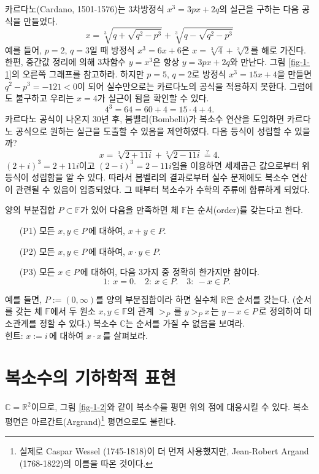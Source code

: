 카르다노(Cardano, 1501-1576)는 3차방정식 $x^3=3px+2q$의 실근을 구하는 다음 공식을 만들었다.
$$
x = \sqrt[3]{q+ \sqrt{q^2-p^3}} + \sqrt[3]{q- \sqrt{q^2-p^3}}
$$
예를 들어, $p=2$, $q=3$일 때 방정식 $x^3=6x+6$은 $x=\sqrt[3]{4}+\sqrt[3]{2}$를 해로 가진다.
한편, 중간값 정리에 의해 3차함수 $y=x^3$은  항상 $y=3px+2q$와 만난다.
그림 \ref{fig-1-1}의 오른쪽 그래프를 참고하라.
하지만 $p=5$, $q=2$로 방정식 $x^3=15 x+4$을 만들면 $q^2-p^3= -121<0$이 되어
실수만으로는 카르다노의 공식을 적용하지 못한다.
그럼에도 불구하고 우리는 $x=4$가 실근이 됨을 확인할 수 있다.
$$
4^3 = 64 = 60 + 4 = 15\cdot 4 + 4.
$$
카르다노 공식이 나온지 30년 후, 봄벨리(Bombelli)가 복소수 연산을 도입하면
카르다노 공식으로 원하는 실근을 도출할 수 있음을 제안하였다.
다음 등식이 성립할 수 있을까?
$$
x = \sqrt[3]{2+11i} + \sqrt[3]{2-11i} \stackrel{?}{=} 4.
$$
$(2+i)^3 = 2+11i$이고 $(2-i)^3 = 2-11i$임을 이용하면
세제곱근 값으로부터 위 등식이 성립함을 알 수 있다.
따라서 봄벨리의 결과로부터 실수 문제에도 복소수 연산이 관련될 수 있음이 입증되었다.
그 때부터 복소수가 수학의 주류에 합류하게 되었다.

\begin{salt_exercise} \label{ex-1-3}
양의 부분집합 $P\subset \mathbb F$가 있어 다음을 만족하면
체 $\mathbb F$는 순서(order)를 갖는다고 한다.
\begin{itemize}[topsep=-0.5\parskip, leftmargin=50pt]
\item[(P1)] 모든 $x,y\in P\,$에 대하여, $x+y\in P$.
\item[(P2)] 모든 $x,y\in P\,$에 대하여, $x\cdot y \in P$.
\item[(P3)] 모든 $x\in P\,$에 대하여, 다음 3가지 중  정확히 한가지만 참이다.
$$
1: \ x=0. \quad 2: \ x\in P. \quad 3: \ -x\in P.
$$
\end{itemize}
예를 들면, $P:=(0,\infty)$를 양의 부분집합이라 하면
실수체 $\mathbb R$은 순서를 갖는다.
(순서를 갖는 체 $\mathbb F$에서 두 원소 $x,y\in \mathbb F$의 관계 $>_P\,$를
$y>_P x\,$는 $y-x \in P\,$로 정의하여 대소관계를 정할 수 있다.)
복소수 $\mathbb C$는 순서를 가질 수 없음을 보여라. \\[1ex]
힌트: $x:=i\,$에 대하여 $x\cdot x\,$를 살펴보라.
\end{salt_exercise}

\section{복소수의 기하학적 표현}

$\mathbb C = \mathbb R^2$이므로, 
그림 \ref{fig-1-2}와 같이 복소수를 평면 위의 점에 대응시킬 수 있다.
복소평면은  아르간트(Argrand)\footnote{ 
실제로 Caspar Wessel (1745-1818)이 더 먼저 사용했지만,
Jean-Robert Argand (1768-1822)의 이름을 따온 것이다.}
평면으로도 불린다.

